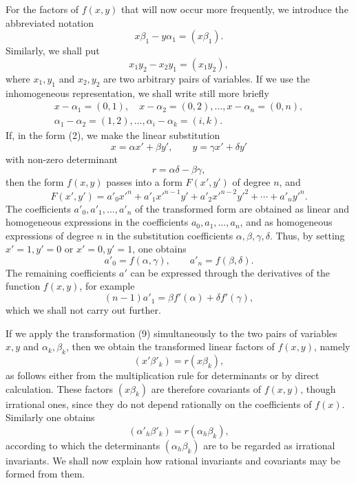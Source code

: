 \documentclass[11pt]{article}
\begin{document}
For the factors of $f(x,y)$ that will now occur more frequently, we introduce the abbreviated notation
\begin{equation}
 x\beta_1-y\alpha_1=(x\beta_1).
\tag{6}
\end{equation}
Similarly, we shall put
\begin{equation}
 x_1y_2-x_2y_1=(x_1y_2),
\tag{7}
\end{equation}
where $x_1,y_1$ and $x_2,y_2$ are two arbitrary pairs of variables. If we use the inhomogeneous representation, we shall write still more briefly
\begin{equation}
\begin{gathered}
 x-\alpha_1=(0,1),\quad x-\alpha_2=(0,2),\ldots,x-\alpha_n=(0,n),\\
 \alpha_1-\alpha_2=(1,2),\ldots,\alpha_i-\alpha_k=(i,k).
\end{gathered}
\tag{8}
\end{equation}
If, in the form (2), we make the linear substitution
\begin{equation}
 x=\alpha x'+\beta y',
 \qquad
 y=\gamma x'+\delta y'
\tag{9}
\end{equation}
with non-zero determinant
\begin{equation}
 r=\alpha\delta-\beta\gamma,
\tag{10}
\end{equation}
then the form $f(x,y)$ passes into a form $F(x',y')$ of degree $n$, and
\begin{equation}
 F(x',y')=a'_0x'^n+a'_1x'^{n-1}y'+a'_2x'^{n-2}y'^2+\cdots+a'_ny'^n.
\tag{11}
\end{equation}
The coefficients $a'_0,a'_1,\ldots,a'_n$ of the transformed form are obtained as linear and homogeneous expressions in the coefficients $a_0,a_1,\ldots,a_n$, and as homogeneous expressions of degree $n$ in the substitution coefficients $\alpha,\beta,\gamma,\delta$. Thus, by setting $x'=1,y'=0$ or $x'=0,y'=1$, one obtains
\begin{equation}
 a'_0=f(\alpha,\gamma),
 \qquad
 a'_n=f(\beta,\delta).
\tag{12}
\end{equation}
The remaining coefficients $a'$ can be expressed through the derivatives of the function $f(x,y)$, for example
\[
 (n-1)a'_1=\beta f'(\alpha)+\delta f'(\gamma),
\]
which we shall not carry out further.

If we apply the transformation (9) simultaneously to the two pairs of variables $x,y$ and $\alpha_k,\beta_k$, then we obtain the transformed linear factors of $f(x,y)$, namely
\begin{equation}
 (x'\beta'_k)=r(x\beta_k),
\tag{13}
\end{equation}
as follows either from the multiplication rule for determinants or by direct calculation. These factors $(x\beta_k)$ are therefore covariants of $f(x,y)$, though irrational ones, since they do not depend rationally on the coefficients of $f(x)$. Similarly one obtains
\begin{equation}
 (\alpha'_h\beta'_k)=r(\alpha_h\beta_k),
\tag{14}
\end{equation}
according to which the determinants $(\alpha_h\beta_k)$ are to be regarded as irrational invariants. We shall now explain how rational invariants and covariants may be formed from them.
\end{document}
